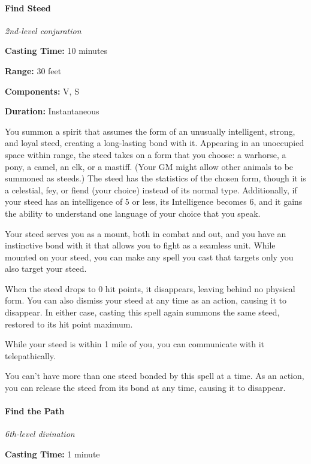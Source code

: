 \documentclass[
]{article}
\begin{document}
\hypertarget{find-steed}{%
\paragraph{Find Steed}\label{find-steed}}

\emph{2nd-level conjuration}

\textbf{Casting Time:} 10 minutes

\textbf{Range:} 30 feet

\textbf{Components:} V, S

\textbf{Duration:} Instantaneous

You summon a spirit that assumes the form of an unusually intelligent,
strong, and loyal steed, creating a long-lasting bond with it. Appearing
in an unoccupied space within range, the steed takes on a form that you
choose: a warhorse, a pony, a camel, an elk, or a mastiff. (Your GM
might allow other animals to be summoned as steeds.) The steed has the
statistics of the chosen form, though it is a celestial, fey, or fiend
(your choice) instead of its normal type. Additionally, if your steed
has an intelligence of 5 or less, its Intelligence becomes 6, and it
gains the ability to understand one language of your choice that you
speak.

Your steed serves you as a mount, both in combat and out, and you have
an instinctive bond with it that allows you to fight as a seamless unit.
While mounted on your steed, you can make any spell you cast that
targets only you also target your steed.

When the steed drops to 0 hit points, it disappears, leaving behind no
physical form. You can also dismiss your steed at any time as an action,
causing it to disappear. In either case, casting this spell again
summons the same steed, restored to its hit point maximum.

While your steed is within 1 mile of you, you can communicate with it
telepathically.

You can't have more than one steed bonded by this spell at a time. As an
action, you can release the steed from its bond at any time, causing it
to disappear.

\hypertarget{find-the-path}{%
\paragraph{Find the Path}\label{find-the-path}}

\emph{6th-level divination}

\textbf{Casting Time:} 1 minute
\end{document}
